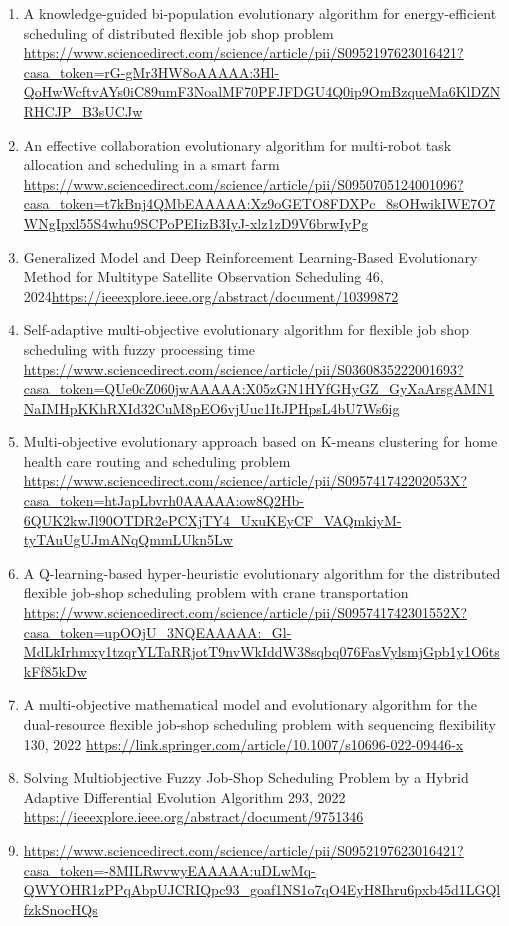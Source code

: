 \documentclass[a4paper,12pt]{article}
\begin{document}
\begin{enumerate}
  \item A knowledge-guided bi-population evolutionary algorithm for energy-efficient scheduling of distributed flexible job shop problem \url{https://www.sciencedirect.com/science/article/pii/S0952197623016421?casa_token=rG-gMr3HW8oAAAAA:3Hl-QoHwWcftvAYs0iC89umF3NoalMF70PFJFDGU4Q0ip9OmBzqueMa6KlDZNRHCJP_B3sUCJw}
  \item An effective collaboration evolutionary algorithm for multi-robot task allocation and scheduling in a smart farm \url{https://www.sciencedirect.com/science/article/pii/S0950705124001096?casa_token=t7kBnj4QMbEAAAAA:Xz9oGETO8FDXPc_8sOHwikIWE7O7WNgIpxl55S4whu9SCPoPEIizB3IyJ-xlz1zD9V6brwIyPg}
  \item Generalized Model and Deep Reinforcement Learning-Based Evolutionary Method for Multitype Satellite Observation Scheduling 46, 2024\url{https://ieeexplore.ieee.org/abstract/document/10399872}
  \item Self-adaptive multi-objective evolutionary algorithm for flexible job shop scheduling with fuzzy processing time \url{https://www.sciencedirect.com/science/article/pii/S0360835222001693?casa_token=QUe0cZ060jwAAAAA:X05zGN1HYfGHyGZ_GyXaArsgAMN1NaIMHpKKhRXId32CuM8pEO6vjUuc1ItJPHpsL4bU7Ws6ig}
  \item Multi-objective evolutionary approach based on K-means clustering for home health care routing and scheduling problem \url{https://www.sciencedirect.com/science/article/pii/S095741742202053X?casa_token=htJapLbvrh0AAAAA:ow8Q2Hb-6QUK2kwJl90OTDR2ePCXjTY4_UxuKEyCF_VAQmkiyM-tyTAuUgUJmANqQmmLUkn5Lw}
  \item A Q-learning-based hyper-heuristic evolutionary algorithm for the distributed flexible job-shop scheduling problem with crane transportation \url{https://www.sciencedirect.com/science/article/pii/S095741742301552X?casa_token=upOOjU_3NQEAAAAA:_Gl-MdLkIrhmxy1tzqrYLTaRRjotT9nvWkIddW38sqbq076FasVylsmjGpb1y1O6tskFf85kDw}
  \item A multi-objective mathematical model and evolutionary algorithm for the dual-resource flexible job-shop scheduling problem with sequencing flexibility 130, 2022 \url{https://link.springer.com/article/10.1007/s10696-022-09446-x}
  \item Solving Multiobjective Fuzzy Job-Shop Scheduling Problem by a Hybrid Adaptive Differential Evolution Algorithm 293, 2022 \url{https://ieeexplore.ieee.org/abstract/document/9751346}
  \item \url{https://www.sciencedirect.com/science/article/pii/S0952197623016421?casa_token=-8MILRwvwyEAAAAA:uDLwMq-QWYOHR1zPPqAbpUJCRIQpc93_goaf1NS1o7qO4EyH8Ihru6pxb45d1LGQlfzkSnocHQs}

\end{enumerate}
\end{document}
